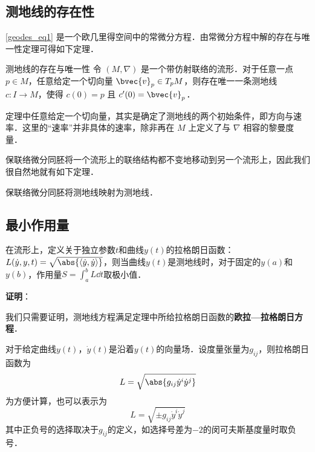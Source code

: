 \subsection{测地线的存在性}

\autoref{geodes_eq1} 是一个欧几里得空间中的常微分方程．由常微分方程中解的存在与唯一性定理可得如下定理．

\begin{theorem}{测地线的存在与唯一性}
令 $(M, \nabla)$ 是一个带仿射联络的流形．对于任意一点 $p\in M$，任意给定一个切向量 $\bvec{v}_p\in T_pM$，则存在唯一一条测地线 $c:I\to M$，使得 $c(0)=p$ 且 $c'(0)=\bvec{v}_p$．
\end{theorem}

定理中任意给定一个切向量，其实是确定了测地线的两个初始条件，即方向与速率．这里的“速率”并非具体的速率，除非再在 $M$ 上定义了与 $\nabla$ 相容的黎曼度量．

保联络微分同胚将一个流形上的联络结构都不变地移动到另一个流形上，因此我们很自然地就有如下定理．

\begin{theorem}{}
保联络微分同胚将测地线映射为测地线．
\end{theorem}



\subsection{最小作用量}

\begin{theorem}{}
在流形上，定义关于独立参数$t$和曲线$y(t)$的拉格朗日函数：$L(\dot{y}, y, t) = \sqrt{\abs{\langle \dot{y}, \dot{y} \rangle}}$，则当曲线$y(t)$是测地线时，对于固定的$y(a)$和$y(b)$，作用量$S=\int_a^b L \dd t$取极小值．
\end{theorem}

\textbf{证明}：

我们只需要证明，测地线方程满足定理中所给拉格朗日函数的\textbf{欧拉—拉格朗日方程}．

对于给定曲线$y(t)$，$\dot{y}(t)$是沿着$y(t)$的向量场．设度量张量为$g_{ij}$，则拉格朗日函数为
\begin{equation}
L = \sqrt{\abs{g_{ij}\dot{y}^i\dot{y}^j}}
\end{equation}
为方便计算，也可以表示为
\begin{equation}
L = \sqrt{\pm{g_{ij}\dot{y}^i\dot{y}^j}}
\end{equation}
其中正负号的选择取决于$g_{ij}$的定义，如选择号差为$-2$的闵可夫斯基度量时取负号．

